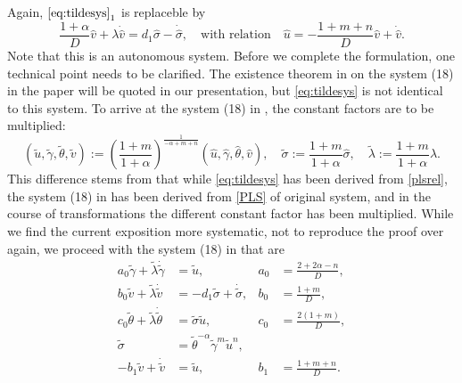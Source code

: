 \documentclass[a4paper,11pt]{article}
\def\tg{{\tilde{\gamma}}}
\def\tv{{\tilde{v}}}
\def\tth{{\tilde{\theta}}}
\def\ts{{\tilde{\sigma}}}
\def\tu{{\tilde{u}}}
\def\hg{{\hat{\gamma}}}
\def\hv{{\hat{v}}}
\def\hth{{\hat{\theta}}}
\def\hs{{\hat{\sigma}}}
\def\hu{{\hat{u}}}
\def\dtg{{\dot{\tilde{\gamma}}}}
\def\dtv{{\dot{\tilde{v}}}}
\def\dtth{{\dot{\tilde{\theta}}}}
\def\dts{{\dot{\tilde{\sigma}}}}
\theoremstyle{remark}
\begin{document}
Again, $\eqref{eq:tildesys}_1$ is replaceble by
$$\frac{1+ \alpha}{D} \hv + \lambda \dot\hv = d_1 \hs -\dot\hs, \quad \text{with relation} \quad \hu = -\frac{1+m+n}{D}\hv + \dot\hv.$$
Note that this is an autonomous system. Before we complete the formulation, one technical point needs to be clarified. The existence theorem in \cite{LKT17} on the system (18) in the paper will be quoted in our presentation, but \eqref{eq:tildesys} is not identical to this system. To arrive at the system (18) in \cite{LKT17}, the constant factors are to be multiplied:
$$(\tu,\tg,\tth,\tv):=\left(\frac{1+m}{1+\alpha}\right)^{\frac{1}{-\alpha+m+n}}(\hu,\hg,\hth,\hv), \quad \ts:=\frac{1+m}{1+\alpha}\hs, \quad \tilde\lambda :=\frac{1+m}{1+\alpha}\lambda.$$
This difference stems from that while \eqref{eq:tildesys} has been derived from \eqref{plsrel}, the system (18) in \cite{LKT17} has been derived from \eqref{PLS} of original system, and in the course of transformations the different constant factor has been multiplied. While we find the current exposition more systematic, not to reproduce the proof over again, we proceed with the system (18) in \cite{LKT17} that are
\begin{equation} \label{eq:tildesys2}
 \begin{aligned}
  a_0\tg + \tilde\lambda\dtg &=\tu, & a_0&=\frac{2+2\alpha-n}{D},\\
  b_0\tv + \tilde\lambda\dtv &=-d_1 \ts + \dts,& b_0&=\frac{1+m}{D},\\
  c_0\tth+ \tilde\lambda\dtth&=\ts\tu, & c_0&=\frac{2(1+m)}{D},\\
  \ts &=\tth^{-\alpha}\tg^m\tu^n, \\
  -b_1\tv+\dtv &= \tu, & b_1&=\frac{1+m+n}{D}.
 \end{aligned}
\end{equation}
%
%
%
\end{document}
